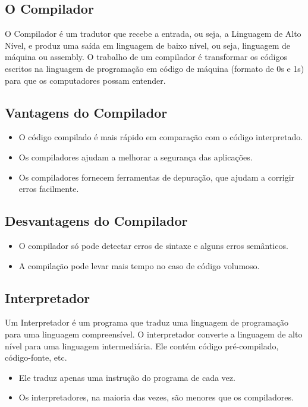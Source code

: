 \documentclass[12pt,a4paper]{abntex2}
\begin{document}
\subsection{O Compilador}
O Compilador é um tradutor que recebe a entrada, ou seja, a Linguagem de Alto Nível,
e produz uma saída em linguagem de baixo nível, ou seja, linguagem de máquina ou assembly.
O trabalho de um compilador é transformar os códigos escritos na linguagem de programação
em código de máquina (formato de 0s e 1s) para que os computadores possam entender.



\subsection{Vantagens do Compilador}

\begin{itemize}
    \item O código compilado é mais rápido em comparação com o código interpretado.
    \item Os compiladores ajudam a melhorar a segurança das aplicações.
    \item Os compiladores fornecem ferramentas de depuração, que ajudam a corrigir erros facilmente.
\end{itemize}

\subsection{Desvantagens do Compilador}

\begin{itemize}
    \item O compilador só pode detectar erros de sintaxe e alguns erros semânticos.
    \item A compilação pode levar mais tempo no caso de código volumoso.

\end{itemize}


\subsection{Interpretador}

Um Interpretador é um programa que traduz uma linguagem de programação para uma linguagem
compreensível. O interpretador converte a linguagem de alto nível para uma linguagem intermediária.
Ele contém código pré-compilado, código-fonte, etc.

\begin{itemize}
    \item Ele traduz apenas uma instrução do programa de cada vez.
    \item Os interpretadores, na maioria das vezes, são menores que os compiladores.
\end{itemize}
\end{document}
